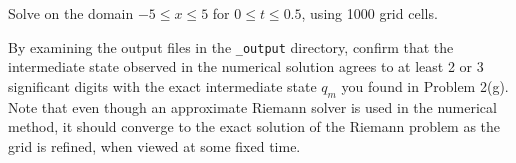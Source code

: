 \documentclass[11pt]{article}
\begin{document}
\begin{enumerate}
Solve on the domain $-5 \leq x \leq 5$ for $0\leq t \leq 0.5$,
using 1000 grid cells.  

By examining the output files in the \verb+_output+ directory,
confirm that the intermediate
state observed in the numerical solution agrees to at least 2 or 3
significant digits with the exact intermediate state $q_m$ you found in Problem
2(g).  Note that even though an approximate Riemann solver is used in
the numerical method, it should converge to the exact solution of the
Riemann problem as the grid is refined, when viewed at some fixed time.



\end{enumerate} 
\end{document}
